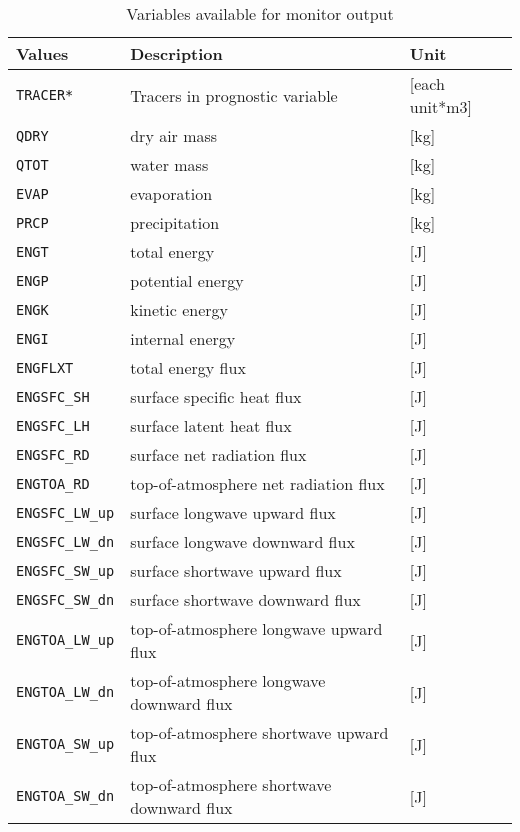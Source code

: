 \begin{table}[h]
\begin{center}
  \caption{Variables available for monitor output}
  \label{tab:varlist_monitor}
  \begin{tabularx}{150mm}{|l|X|X|} \hline
    \rowcolor[gray]{0.9}  Values & Description & Unit \\ \hline
      \verb|TRACER*|      & Tracers in prognostic variable            & [each unit*m3] \\
      \verb|QDRY|         & dry air mass                              & [kg] \\
      \verb|QTOT|         & water mass                                & [kg] \\
      \verb|EVAP|         & evaporation                               & [kg] \\
      \verb|PRCP|         & precipitation                             & [kg] \\
      \verb|ENGT|         & total     energy                          & [J] \\
      \verb|ENGP|         & potential energy                          & [J] \\
      \verb|ENGK|         & kinetic   energy                          & [J] \\
      \verb|ENGI|         & internal  energy                          & [J] \\
      \verb|ENGFLXT|      & total energy flux                         & [J] \\
      \verb|ENGSFC_SH|    & surface specific heat flux                & [J] \\
      \verb|ENGSFC_LH|    & surface latent   heat flux                & [J] \\
      \verb|ENGSFC_RD|    & surface net radiation flux                & [J] \\
      \verb|ENGTOA_RD|    & top-of-atmosphere net radiation flux      & [J] \\
      \verb|ENGSFC_LW_up| & surface longwave  upward   flux           & [J] \\
      \verb|ENGSFC_LW_dn| & surface longwave  downward flux           & [J] \\
      \verb|ENGSFC_SW_up| & surface shortwave upward   flux           & [J] \\
      \verb|ENGSFC_SW_dn| & surface shortwave downward flux           & [J] \\
      \verb|ENGTOA_LW_up| & top-of-atmosphere longwave  upward   flux & [J] \\
      \verb|ENGTOA_LW_dn| & top-of-atmosphere longwave  downward flux & [J] \\
      \verb|ENGTOA_SW_up| & top-of-atmosphere shortwave upward   flux & [J] \\
      \verb|ENGTOA_SW_dn| & top-of-atmosphere shortwave downward flux & [J] \\
    \hline
  \end{tabularx}
\end{center}
\end{table}

